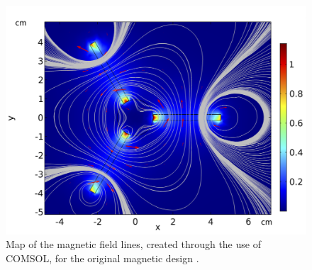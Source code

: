 \begin{figure}
    \centering
    \includegraphics[scale=0.5]{Future_Figs/fieldmap.png}
    \caption{Map of the magnetic field lines, created through the use of COMSOL, for the original magnetic design \citep{comsol:_comsol}.}
    \label{fig:fieldmap}
\end{figure}